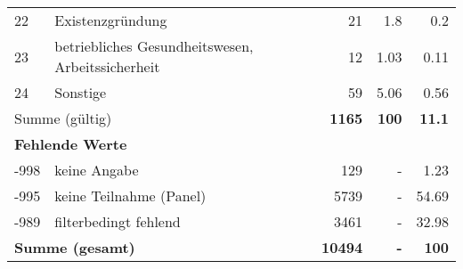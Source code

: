 \begin{longtable}{lXrrr}
        22 & \multicolumn{1}{X}{Existenzgründung} & %
          \num{21} &
          \num[round-mode=places,round-precision=2]{1,8} &
          \num[round-mode=places,round-precision=2]{0,2} \\

        23 & \multicolumn{1}{X}{betriebliches Gesundheitswesen, Arbeitssicherheit} & %
          \num{12} &
          \num[round-mode=places,round-precision=2]{1,03} &
          \num[round-mode=places,round-precision=2]{0,11} \\

        24 & \multicolumn{1}{X}{Sonstige} & %
          \num{59} &
          \num[round-mode=places,round-precision=2]{5,06} &
          \num[round-mode=places,round-precision=2]{0,56} \\

     \midrule
     \multicolumn{2}{l}{Summe (gültig)} &
       \textbf{\num{1165}} &
     \textbf{100} &
       \textbf{\num[round-mode=places,round-precision=2]{11,1}} \\
     \multicolumn{5}{l}{\textbf{Fehlende Werte}}\\
       -998 &
       keine Angabe &
         \num{129} &
        - &
         \num[round-mode=places,round-precision=2]{1,23} \\
       -995 &
       keine Teilnahme (Panel) &
         \num{5739} &
        - &
         \num[round-mode=places,round-precision=2]{54,69} \\
       -989 &
       filterbedingt fehlend &
         \num{3461} &
        - &
         \num[round-mode=places,round-precision=2]{32,98} \\
     \midrule
     \multicolumn{2}{l}{\textbf{Summe (gesamt)}} &
          \textbf{\num{10494}} &
        \textbf{-} &
        \textbf{100} \\
     \bottomrule
     \end{longtable}
     
